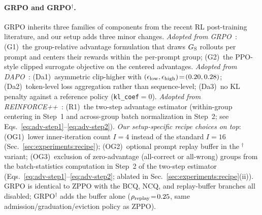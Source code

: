 \documentclass{llmxive}
\begin{document}
\paragraph{GRPO and GRPO\texorpdfstring{$^{\dagger}$}{...}.}
GRPO inherits three families of components from the recent RL post-training literature, and our setup adds three minor changes. \emph{Adopted from GRPO~\citep{shao2024deepseekmath}}: (G1)~the group-relative advantage formulation that draws $G_{\rm S}$ rollouts per prompt and centers their rewards within the per-prompt group; (G2)~the PPO-style clipped surrogate objective on the centered advantages. \emph{Adopted from DAPO~\citep{yu2025dapo}}: (Da1)~asymmetric clip-higher with $(\epsilon_{\rm low},\epsilon_{\rm high})\!=\!(0.20, 0.28)$; (Da2)~token-level loss aggregation rather than sequence-level; (Da3)~no KL penalty against a reference policy (\texttt{kl\_coef}$=\!0$). \emph{Adopted from REINFORCE++~\citep{hu2025reinforce++}}: (R1)~the two-step advantage estimator (within-group centering in Step~1 and across-group batch normalization in Step~2; see Eqs.~\ref{eq:adv-step1}--\ref{eq:adv-step2}). \emph{Our setup-specific recipe choices on top}: (OG1)~lower inner-iteration count $I\!=\!4$ instead of the standard $I\!=\!16$ (Sec.~\ref{sec:experiments:recipe}); (OG2)~optional prompt replay buffer in the $^{\dagger}$ variant; (OG3)~exclusion of zero-advantage (all-correct or all-wrong) groups from the batch-statistics computation in Step~2 of the two-step estimator (Eqs.~\ref{eq:adv-step1}--\ref{eq:adv-step2}; ablated in Sec.~\ref{sec:experiments:recipe}(ii)). GRPO is identical to ZPPO with the BCQ, NCQ, and replay-buffer branches all disabled; GRPO$^{\dagger}$ adds the buffer alone ($\rho_{\rm replay}\!=\!0.25$, same admission/graduation/eviction policy as ZPPO).
\end{document}
